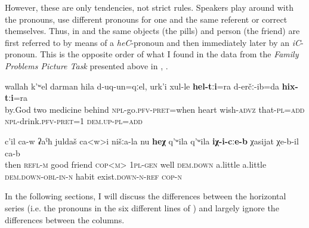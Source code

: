 However, these are only tendencies, not strict rules. Speakers play around with the pronouns, use different pronouns for one and the same referent or correct themselves. Thus, in  and  the same objects (the pills) and person (the friend) are first referred to by means of a \textit{heC}-pronoun and then immediately later by an \textit{iC}-pronoun. This is the opposite order of what I found in the data from the \textit{Family Problems Picture Task} presented above in , .
%
\begin{exe}
	\ex	\label{By God, when two pills (i.e. medicines) were left behind, (I) also}
	\gll	wallah	k'ʷel	darman	hila	d-uq-un=qːel,	urk'i	xul-le	\textbf{hel-tːi}=ra	d-erčː-ib=da	\textbf{hix-tːi}=ra \\
		by.God two medicine behind \textsc{npl}-go.\textsc{pfv-pret}=when heart	wish-\textsc{advz} that-\textsc{pl}=\textsc{add} \textsc{npl}-drink.\textsc{pfv}-\textsc{pret}=1 \textsc{dem.up-pl}=\textsc{add}\\
	\glt	{}
	
	 \label{He is our good friend, but he has a bit this habit}
	\sn
	\gll	c'il	ca-w	ʡaˁħ	juldaš	ca<w>i	nišːa-la	nu	\textbf{heχ}	q'ʷila	q'ʷila	\textbf{iχ-i-cːe-b}	χasijat	χe-b-il	ca-b\\
		then	\textsc{refl-m}	good	friend	\textsc{cop<m>}	\textsc{1pl}-\textsc{gen}	well		\textsc{dem.down}	a.little	a.little	\textsc{dem.down}-\textsc{obl-in}-\textsc{n}	habit	exist.\textsc{down}-\textsc{n}-\textsc{ref}	\textsc{cop-n}\\
	\glt	{}
\end{exe}

In the following sections, I will discuss the differences between the horizontal series (i.e. the pronouns in the six different lines of ) and largely ignore the differences between the columns.


